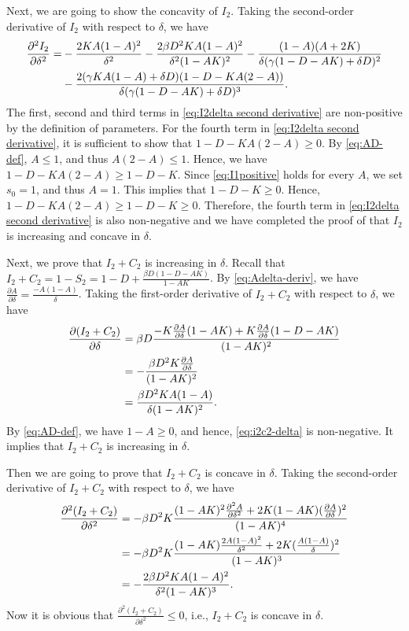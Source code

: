 \documentclass[nonblindrev, copyedit]{informs3a}
\begin{document}
Next, we are going to show the concavity of $I_2$. Taking the second-order derivative of $I_2$ with respect to $\delta$, we have
\begin{align}
    \frac{\partial^2 I_2}{\partial \delta^2}=&-\frac{2KA(1-A)^2}{\delta^2}-\frac{2\beta D^2KA(1-A)^2}{\delta^2(1-AK)^2}-\frac{(1-A)(A+2K)}{\delta(\gamma(1-D-AK)+\delta D)^2}\notag\\
    &-\frac{2(\gamma KA(1-A)+\delta D)(1-D- KA(2-A))}{\delta(\gamma(1-D-AK)+\delta D)^3}.\label{eq:I2delta second derivative}
\end{align}
The first, second and third terms in \eqref{eq:I2delta second derivative} are non-positive by the definition of parameters.
For the fourth term in \eqref{eq:I2delta second derivative}, it is sufficient to show that $1-D-KA(2-A)\ge0$. By \eqref{eq:AD-def}, $A\le1$, and thus $A(2-A)\le 1$. Hence, we have $1-D-KA(2-A)\ge1-D-K$.
Since \eqref{eq:I1positive} holds for every $A$, we set $s_0=1$, and thus $A=1$. This implies that $1-D-K\ge0$. Hence, $1-D-KA(2-A)\ge1-D-K\ge0$.
Therefore, the fourth term in \eqref{eq:I2delta second derivative} is also non-negative and we have completed the proof of that $I_2$ is increasing and concave in $\delta$.

Next, we prove that $I_2+C_2$ is increasing in $\delta$.
Recall that $I_2+C_2=1-S_2=1-D+\frac{\beta D(1-D-AK)}{1-AK}$. By \eqref{eq:Adelta-deriv}, we have $\frac{\partial A}{\partial\delta}=\frac{-A(1-A)}{\delta}$. Taking the first-order derivative of $I_2+C_2$ with respect to $\delta$, we have
\begin{align}\label{eq:i2c2-delta}
    \frac{\partial (I_2+C_2)}{\partial \delta}&=\beta D\frac{-K\frac{\partial A}{\partial\delta}(1-AK)+K\frac{\partial A}{\partial\delta}(1-D-AK)}{(1-AK)^2}\notag\\
    &=-\frac{\beta D^2K\frac{\partial A}{\partial\delta}}{(1-AK)^2}\notag\\
    &=\frac{\beta D^2KA(1-A)}{\delta(1-AK)^2}.
\end{align}
By \eqref{eq:AD-def}, we have $1-A\ge0$, and hence, \eqref{eq:i2c2-delta} is non-negative. It implies that $I_2+C_2$ is increasing in $\delta$.

Then we are going to prove that $I_2+C_2$ is concave in $\delta$. Taking the second-order derivative of $I_2+C_2$ with respect to $\delta$, we have
\begin{align}\label{eq:i2c2-second deriv}
    \frac{\partial^2 (I_2+C_2)}{\partial \delta^2}&=-\beta D^2K\frac{(1-AK)^2\frac{\partial^2 A}{\partial \delta^2}+2K(1-AK)(\frac{\partial A}{\partial \delta})^2}{(1-AK)^4}\notag\\
    &=-\beta D^2K\frac{(1-AK)\frac{2A(1-A)^2}{\delta^2}+2K(\frac{A(1-A)}{\delta})^2}{(1-AK)^3}\notag\\
    &=-\frac{2\beta D^2KA(1-A)^2}{\delta^2(1-AK)^3}.
\end{align}
Now it is obvious that $\frac{\partial^2 (I_2+C_2)}{\partial \delta^2}\le0$, i.e., $I_2+C_2$ is concave in $\delta$.\Halmos
\endproof
\end{document}
